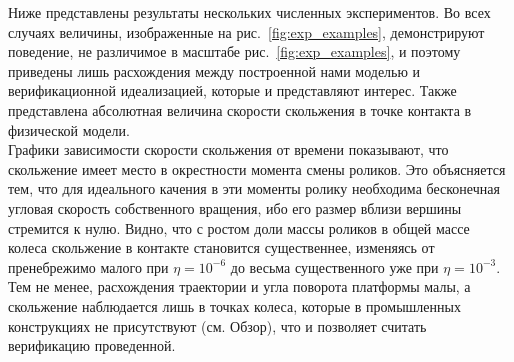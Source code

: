 Ниже представлены результаты нескольких численных экспериментов. Во всех случаях величины, изображенные на рис.~\ref{fig:exp_examples}, демонстрируют поведение, не различимое в масштабе рис.~\ref{fig:exp_examples}, и поэтому приведены лишь расхождения между построенной нами моделью и верификационной идеализацией, которые и представляют интерес. Также представлена абсолютная величина скорости скольжения в точке контакта в физической модели.\\

Графики зависимости скорости скольжения от времени показывают, что скольжение имеет место в окрестности момента смены роликов. Это объясняется тем, что для идеального качения в эти моменты ролику необходима бесконечная угловая скорость собственного вращения, ибо его размер вблизи вершины стремится к нулю. Видно, что с ростом доли массы роликов в общей массе колеса скольжение в контакте становится существеннее, изменяясь от пренебрежимо малого при $\eta = 10^{-6}$ до весьма существенного уже при $\eta = 10^{-3}$. Тем не менее, расхождения траектории и угла поворота платформы малы, а скольжение наблюдается лишь в точках колеса, которые в промышленных конструкциях не присутствуют (см. Обзор), что и позволяет считать верификацию проведенной.
\newpage

